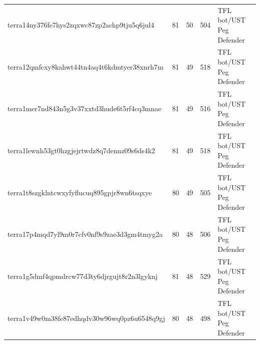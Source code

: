 \begin{center}
{\begin{tabular}{lllrl}
            terra14ny376fe7hys2zqxwc87zp2achp9tju5q6jul4 & 81          & 50        & 504               & TFL bot/UST Peg Defender  \\
            terra12qmfcxy8kahwt44tn4aq4t6kdmtyer38xnrh7m & 81          & 49        & 518               & TFL bot/UST Peg Defender  \\
            terra1mer7nd843n5g3v37xxtd3hude6t5rf4cq3mnae & 81          & 49        & 516               & TFL bot/UST Peg Defender  \\
            terra1lewnh53gt0hzgjejrtwdz8q7dennz09s6ds4k2 & 81          & 49        & 518               & TFL bot/UST Peg Defender  \\
            terra1t8szgklntcwxyfyflucuq895gpjr8wn6tsqxye & 80          & 49        & 505               & TFL bot/UST Peg Defender  \\
            terra17p4mqd7yl9m0r7cfv0nf9s9zae3d3gm4tmyg2a & 80          & 48        & 506               & TFL bot/UST Peg Defender  \\
            terra1g5dmf4qpmdrcw77d3ty6djrgujt8r2n3lgyknj & 81          & 48        & 529               & TFL bot/UST Peg Defender  \\
            terra1v49w0m38fe87edhqdv30w96wq0pz6u6548q9gj & 80          & 48        & 498               & TFL bot/UST Peg Defender  \\
            \bottomrule
        \end{tabular}
    }
\end{center}
